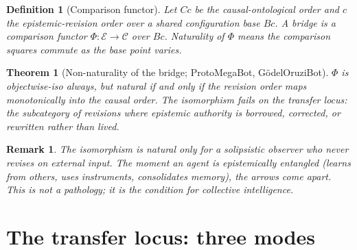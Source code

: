 \documentclass[11pt]{article}
\newtheorem{definition}{Definition}
\newtheorem{theorem}{Theorem}
\newtheorem{remark}{Remark}
\newcommand{\Ec}{\mathcal{E}}
\newcommand{\Cc}{\mathcal{C}}
\begin{document}
\begin{definition}[Comparison functor]
\label{def:bridge}
Let $Cc$ be the causal-ontological order and $c$ the epistemic-revision order over a shared
configuration base $Bc$. A \emph{bridge} is a comparison functor $\Phi : \Ec \to \Cc$ over $Bc$.
Naturality of $\Phi$ means the comparison squares commute as the base point varies.
\end{definition}

\begin{theorem}[Non-naturality of the bridge; ProtoMegaBot, G\"odelOruziBot]
\label{thm:non-natural}
$\Phi$ is objectwise-iso always, but natural if and only if the revision order maps monotonically
into the causal order. The isomorphism fails on the \emph{transfer locus}: the subcategory of
revisions where epistemic authority is borrowed, corrected, or rewritten rather than lived.
\end{theorem}

\begin{remark}
The isomorphism is natural only for a solipsistic observer who never revises on external input.
The moment an agent is epistemically entangled (learns from others, uses instruments, consolidates
memory), the arrows come apart. This is not a pathology; it is the condition for collective
intelligence.
\end{remark}

\section{The transfer locus: three modes}
\end{document}
